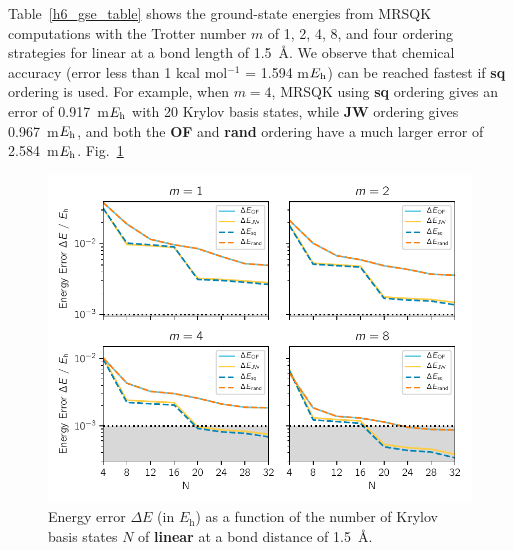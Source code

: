 \documentclass[journal=jctcce,manuscript=article]{achemso}
\newcommand*{\Eh}{$E_{\rm h}$\xspace}
\newcommand{\methodabbr}[0]{MRSQK\xspace}
\begin{document}
Table~\ref{h6_gse_table} shows the ground-state energies from \methodabbr computations with the Trotter number $m$ of 1, 2, 4, 8, and four ordering strategies for linear  at a bond length of 1.5~\AA.
We observe that chemical accuracy (error less than 1 kcal mol$^{-1}$ = 1.594 m\Eh) can be reached fastest if \textbf{sq} ordering is used. 
For example, when $m=4$, \methodabbr using \textbf{sq} ordering gives an error of 0.917~m\Eh with 20 Krylov basis states, while \textbf{JW} ordering gives 0.967~m\Eh, and both the \textbf{OF} and \textbf{rand} ordering have a much larger error of 2.584~m\Eh.
Fig.~\ref{h6_error-N} 

\begin{figure}[h!]
  \centering
  \includegraphics[width=4.5in]{figs/h6_error-N_order.pdf}
  \caption{Energy error $\Delta E$ (in $E_\mathrm{h}$) as a function of the number of Krylov basis states $N$ of \textbf{linear } at a bond distance of 1.5~\AA.
   }
\label{h6_error-N}
\end{figure}
\end{document}
